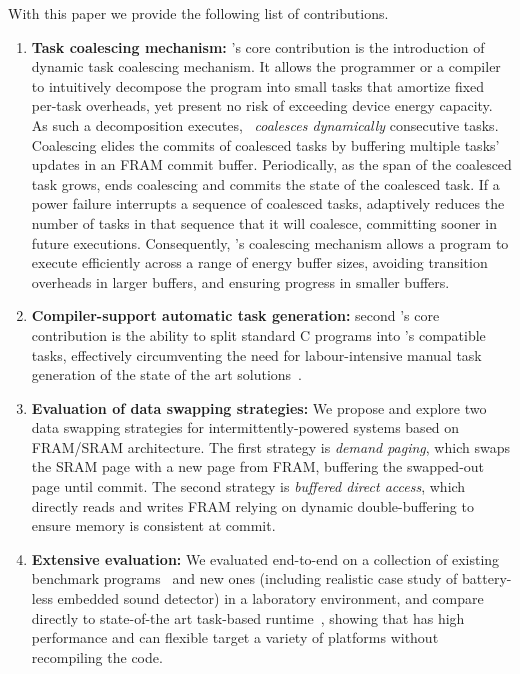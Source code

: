 With this paper we provide the following list of contributions.
%
\begin{enumerate}
%
\item {\bf Task coalescing mechanism:} \sys's core contribution is the introduction of dynamic task coalescing mechanism. It allows the programmer or a compiler to intuitively decompose the program into small tasks that amortize fixed per-task overheads, yet present no risk of exceeding device energy capacity. As such a decomposition executes, \sys~{\em coalesces dynamically} consecutive tasks. Coalescing elides the commits of coalesced tasks by buffering multiple tasks' updates in an FRAM commit buffer. Periodically, as the span of the coalesced task grows, \sys ends coalescing and commits the state of the coalesced task. If a power failure interrupts a sequence of coalesced tasks, \sys adaptively reduces the number of tasks in that sequence that it will coalesce, committing sooner in future executions. Consequently, \sys's coalescing mechanism allows a program to execute efficiently across a range of energy buffer sizes, avoiding transition overheads in larger buffers, and ensuring progress in smaller buffers.
%

\item {\bf Compiler-support automatic task generation:} second \sys's core contribution is the ability to split standard C programs into \sys's compatible tasks, effectively circumventing the need for labour-intensive manual task generation of the state of the art solutions~\cite{chain,alpaca}.
%
%
\item {\bf Evaluation of data swapping strategies:} We propose and explore two data swapping strategies for intermittently-powered systems based on FRAM/SRAM architecture. The first strategy is {\em demand paging}, which swaps the SRAM page with a new page from FRAM, buffering the swapped-out page until commit. The second strategy is {\em buffered direct access}, which directly reads and writes FRAM relying on dynamic double-buffering to ensure memory is consistent at
commit. 
%
%
\item {\bf Extensive \sys evaluation:} We evaluated \sys end-to-end on a collection of existing benchmark programs~\cite[Sec. 5]{chain} and new ones (including realistic case study of battery-less embedded sound detector) in a laboratory environment, and compare directly to state-of-the art task-based runtime~\cite{chain}, showing that \sys has high performance and can flexible target a variety of platforms without recompiling the code. 
%
%
\end{enumerate}
